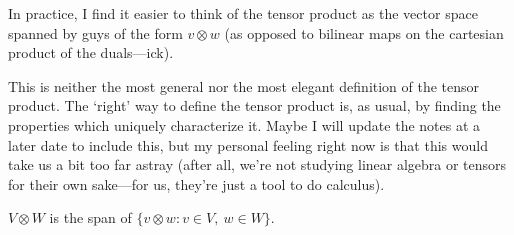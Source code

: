 \begin{dfn}
\begin{rmk}
\end{rmk}
\begin{rmk}
In practice, I find it easier to think of the tensor product as the vector space spanned by guys of the form $v\otimes w$ (as opposed to bilinear maps on the cartesian product of the duals---ick).
\end{rmk}
\begin{rmk}
This is neither the most general nor the most elegant definition of the tensor product.  The `right' way to define the tensor product is, as usual, by finding the properties which uniquely characterize it.  Maybe I will update the notes at a later date to include this, but my personal feeling right now is that this would take us a bit too far astray (after all, we're not studying linear algebra or tensors for their own sake---for us, they're just a tool to do calculus).
\end{rmk}
\end{dfn}
\begin{prp}\label{prp5.1.8}
$V\otimes W$ is the span of $\{ v\otimes w:v\in V,\ w\in W\}$.
\end{prp}

